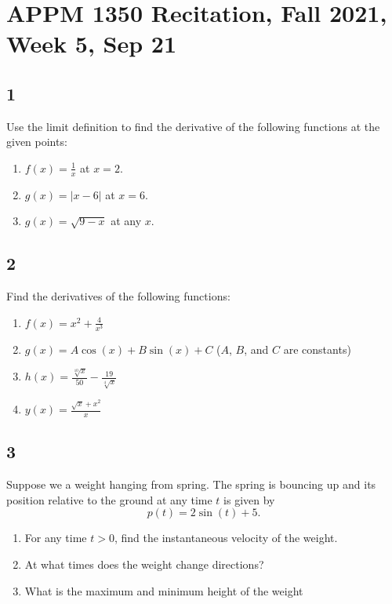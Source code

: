 \documentclass[letterpaper,12pt]{article}
\begin{document}
\section*{APPM 1350 Recitation, Fall 2021, Week  5, Sep 21}
\subsection*{1}
Use the limit definition to find the derivative of the following functions at the given points:
		\begin{enumerate}[label=\alph*)]
			\item $f(x)=\frac{1}{x}$ at $x=2$.
			\item $g(x)=|x-6|$ at $x=6$.
			\item $g(x)=\sqrt{9-x}$ at any $x$.
		\end{enumerate}

\subsection*{2}
		Find the derivatives of the following functions:
		\begin{enumerate}[label=\alph*)]
			\item $f(x)=x^2+\frac{4}{x^3}$
			\item $g(x)=A\cos(x)+B\sin(x)+C$ ($A$, $B$, and $C$ are constants)
			\item $h(x)=\frac{\sqrt[10]{x}}{50}-\frac{19}{\sqrt[4]{x}}$
			\item $y(x)=\frac{\sqrt{x}+x^2}{x}$
		\end{enumerate}
	
\subsection*{3}
	Suppose we a weight hanging from spring. The spring is bouncing up and its position relative to the ground at any time $ t $ is given by 
		\[
			p(t) = 2\sin(t) + 5.
		\]
		\begin{enumerate}[label = \alph*)]
			\item For any time $ t > 0 $, find the instantaneous velocity of the weight.
			
			\item At what times does the weight change directions?
			
			\item What is the maximum and minimum height of the weight
		\end{enumerate}
\end{document}
